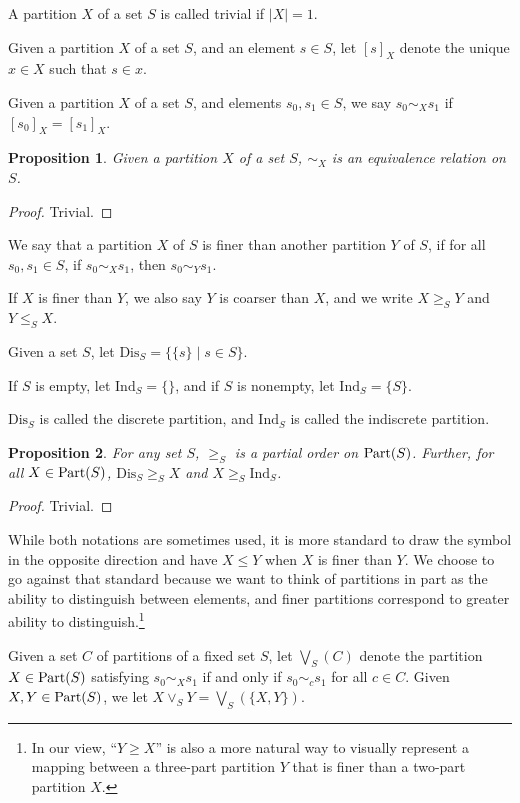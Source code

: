\documentclass[authordate,onecolumn]{miri-tech-article}
\newtheorem{proposition}{Proposition}
\begin{document}
\begin{definition}
A partition $X$ of a set $S$ is called trivial if $|X|=1$.
\end{definition}
\begin{definition}
Given a partition $X$ of a set $S$, and an element $s\in S$, let $[s]_X$ denote the unique $x\in X$ such that $s\in x$. 
\end{definition}
\begin{definition}
Given a partition $X$ of a set $S$, and elements $s_0,s_1\in S$, we say $s_0\sim_X s_1$ if $[s_0]_X=[s_1]_X$.
\end{definition}
\begin{proposition}
Given a partition $X$ of a set $S$, $\sim_X$ is an equivalence relation on $S$.
\end{proposition}
\begin{proof}
Trivial.
\end{proof}
\begin{definition}
We say that a partition $X$ of $S$ is finer than another partition $Y$ of $S$, if for all $s_0,s_1\in S$, if $s_0\sim_{X}s_1$, then $s_0\sim_{Y} s_1$.

If $X$ is finer than $Y$, we also say $Y$ is coarser than $X$, and we write $X\geq_S Y$ and $Y\leq_S X$.
\end{definition}
\begin{definition}
Given a set $S$, let $\text{Dis}_S=\{\{s\}\mid s\in S\}$.

If $S$ is empty, let $\text{Ind}_S=\{\}$, and if $S$ is nonempty, let $\text{Ind}_S=\{S\}$.

$\text{Dis}_S$ is called the discrete partition, and $\text{Ind}_S$ is called the indiscrete partition.
\end{definition}
\begin{proposition}
For any set $S$, $\geq_S$ is a partial order on $\text{Part}(S)$. Further, for all $X\in\text{Part}(S)$, $\text{Dis}_S\geq_S X$ and $X\geq_S \text{Ind}_S$.
\end{proposition}
\begin{proof}
Trivial.
\end{proof}
While both notations are sometimes used, it is more standard to draw the symbol in the opposite direction and have $X\leq Y$ when $X$ is finer than $Y$. We choose to go against that standard because we want to think of partitions in part as the ability to distinguish between elements, and finer partitions correspond to greater ability to distinguish.\footnote{In our view, ``$Y \geq X$'' is also a more natural way to visually represent a mapping between a three-part partition $Y$ that is finer than a two-part partition $X$.}
\begin{definition}
Given a set $C$ of partitions of a fixed set $S$, let $\bigvee_S(C)$ denote the partition $X\in\text{Part}(S)$ satisfying $s_0\sim_{X} s_1$ if and only if $s_0\sim_c s_1$ for all $c\in C$.
Given $X,Y\in\text{Part}(S)$, we let $X\vee_S Y=\bigvee_S(\{X,Y\})$.
\end{definition}
\end{document}
